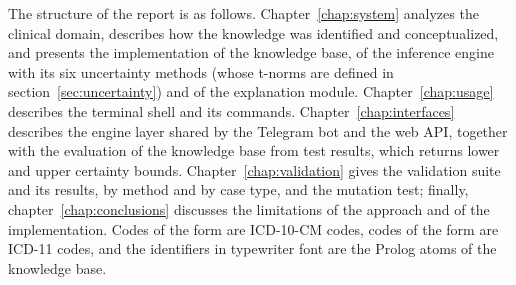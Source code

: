 The structure of the report is as follows. Chapter~\ref{chap:system} analyzes
the clinical domain, describes how the knowledge was identified and
conceptualized, and presents the implementation of the knowledge base, of the
inference engine with its six uncertainty methods (whose t-norms are defined in
section~\ref{sec:uncertainty}) and of the explanation module.
Chapter~\ref{chap:usage} describes the terminal shell and its commands.
Chapter~\ref{chap:interfaces} describes the engine layer shared by the Telegram
bot and the web API, together with the evaluation of the knowledge base from
test results, which returns lower and upper certainty bounds.
Chapter~\ref{chap:validation} gives the validation suite and its results, by
method and by case type, and the mutation test; finally,
chapter~\ref{chap:conclusions} discusses the limitations of the approach and of
the implementation. Codes of the form  are ICD-10-CM codes, codes of
the form  are ICD-11 codes, and the identifiers in typewriter font
are the Prolog atoms of the knowledge base.
